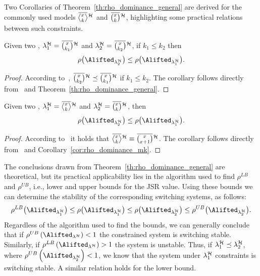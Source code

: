 Two Corollaries of Theorem~\ref{th:rho_dominance_general} are derived for the commonly used models $\erowmiss{}{\strat}$ and $\eanymiss{}{\strat}$, highlighting some practical relations between such constraints.
\begin{corollary}%
    \label{cor:rho_dominance_mk}%
    Given two \ewhc{}, $\lambda^\strat_1 = \overbar{\binom{x}{k_1}}^{\strat}$ and $\lambda^\strat_2 = \overbar{\binom{x}{k_2}}^{\strat}$, if $k_1 \leq k_2$ then
    \begin{equation*}
        \rho\bigl(\Alifted_{\lambda^\strat_2}\bigr) \leq \rho\bigl(\Alifted_{\lambda^\strat_1}\bigr).
    \end{equation*}
    \begin{proof}
        According to~\cite{Wu:2020}, $\overbar{\binom{x}{k_2}}^{\strat}\preceq\overbar{\binom{x}{k_1}}^{\strat}$ if $k_1 \leq k_2$.
        The corollary follows directly from~\cite{Wu:2020} and Theorem~\ref{th:rho_dominance_general}.
    \end{proof}
\end{corollary}
%
\begin{corollary}%
    \label{cor:rho_dominance_cons}%
    Given two \ewhc{}, $\lambda^\strat_1 = \erowmiss{}{\strat}$ and $\lambda^\strat_2 =\eanymiss{}{\strat}$, then
    \begin{equation*}
        \rho\bigl(\Alifted_{\lambda^\strat_2}\bigr) \leq \rho\bigl(\Alifted_{\lambda^\strat_1}\bigr).
    \end{equation*}
    \begin{proof}
        According to~\cite{Maggio:2020} it holds that $\erowmiss{}{\strat} \equiv \overbar{\binom{x}{x+1}}^{\strat}$.
        The corollary follows directly from~\cite{Maggio:2020} and Corollary~\ref{cor:rho_dominance_mk}.
    \end{proof}
\end{corollary}
%
The conclusions drawn from Theorem~\ref{th:rho_dominance_general} are theoretical, but its practical applicability lies in the algorithm used to find $\rho^{LB}$ and $\rho^{UB}$, i.e., lower and upper bounds for the JSR value.
Using these bounds we can determine the stability of the corresponding switching systems, as follows:
%
$$
\rho^{LB} \bigl( \Alifted_{\lambda^\strat_1} \bigr) \leq \rho \bigl( \Alifted_{\lambda^\strat_1} \bigr) \leq \rho \bigl( \Alifted_{\lambda^\strat_2} \bigr) \leq \rho^{UB} \bigl( \Alifted_{\lambda^\strat_2} \bigr).
$$
%
Regardless of the algorithm used to find the bounds, we can generally conclude that if $\rho^{UB} \left( \Alifted_{\lambda^\strat} \right) < 1$ the constrained system is switching stable.
Similarly, if $\rho^{LB} \left( \Alifted_{\lambda^\strat} \right) > 1$ the system is unstable.
Thus, if $\lambda^{\mathcal{H}}_1 \preceq \lambda^{\mathcal{H}}_2$, where $\rho^{UB} \left( \Alifted_{\lambda^\strat_2} \right) < 1$, we know that the system under $\lambda^{\mathcal{H}}_1$ constraints is switching stable.
A similar relation holds for the lower bound.

